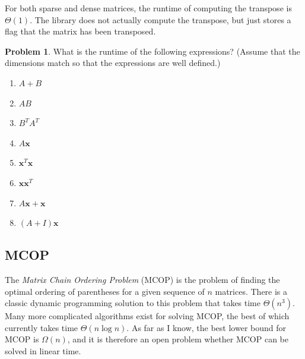 \documentclass[10pt]{article}
\theoremstyle{definition}
\newtheorem{problem}{Problem}
\newcommand{\trans}[1]{{#1}^{T}}
\newcommand{\x}{\mathbf x}
\begin{document}
For both sparse and dense matrices,
the runtime of computing the transpose is $\Theta(1)$.
The library does not actually compute the transpose,
but just stores a flag that the matrix has been transposed.

\begin{problem}
    What is the runtime of the following expressions?
    (Assume that the dimensions match so that the expressions are well defined.)

    \begin{enumerate}
        \item
            $A + B$
            \vspace{1in}
        \item
            $AB$
            \vspace{1in}
        \item
            $\trans B \trans A$
            \vspace{1in}
        \item
            $A\x$
            \vspace{1in}
        \item
            $\trans \x \x$
            \vspace{1in}
        \item
            $\x\trans \x$
            \vspace{1in}
        \item
            $A\x + \x$
            \vspace{1in}
        \item
            $(A+I)\x$
            \vspace{1in}
    \end{enumerate}
\end{problem}


\subsection{MCOP}

The \emph{Matrix Chain Ordering Problem} (MCOP) is the problem of finding the optimal ordering of parentheses for a given sequence of $n$ matrices.
There is a classic dynamic programming solution to this problem that takes time $\Theta(n^3)$.
Many more complicated algorithms exist for solving MCOP,
the best of which currently takes time $\Theta(n \log n)$.
As far as I know, the best lower bound for MCOP is $\Omega(n)$,
and it is therefore an open problem whether MCOP can be solved in linear time.
\end{document}
